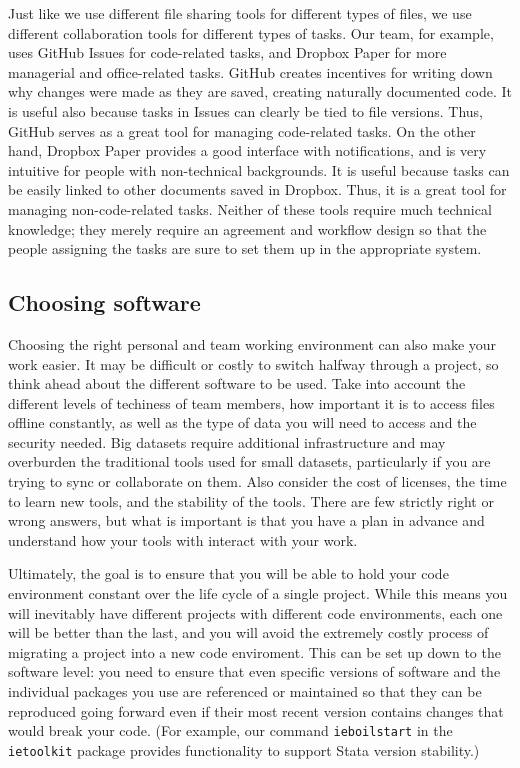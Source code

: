 Just like we use different file sharing tools for different types of files,
we use different collaboration tools for different types of tasks.
Our team, for example, uses GitHub Issues for code-related tasks,
and Dropbox Paper for more managerial and office-related tasks.
GitHub creates incentives for writing down why changes were made
as they are saved, creating naturally documented code.
It is useful also because tasks in Issues can clearly be tied to file versions.
Thus, GitHub serves as a great tool for managing code-related tasks.
On the other hand, Dropbox Paper provides a good interface with notifications,
and is very intuitive for people with non-technical backgrounds.
It is useful because tasks can be easily linked to other documents saved in Dropbox.
Thus, it is a great tool for managing non-code-related tasks.
Neither of these tools require much technical knowledge;
they merely require an agreement and workflow design
so that the people assigning the tasks are sure to set them up in the appropriate system.

\subsection{Choosing software}

Choosing the right personal and team working environment can also make your work easier.
It may be difficult or costly to switch halfway through a project, so
think ahead about the different software to be used.
Take into account the different levels of techiness of team members,
how important it is to access files offline constantly,
as well as the type of data you will need to access and the security needed.
Big datasets require additional infrastructure and may overburden
the traditional tools used for small datasets,
particularly if you are trying to sync or collaborate on them.
Also consider the cost of licenses, the time to learn new tools,
and the stability of the tools.
There are few strictly right or wrong answers,
but what is important is that you have a plan in advance
and understand how your tools with interact with your work.

Ultimately, the goal is to ensure that you will be able to hold
your code environment constant over the life cycle of a single project.
While this means you will inevitably have different projects
with different code environments, each one will be better than the last,
and you will avoid the extremely costly process of migrating a project
into a new code enviroment.
This can be set up down to the software level:
you need to ensure that even specific versions of software
and the individual packages you use
are referenced or maintained so that they can be reproduced going forward
even if their most recent version contains changes that would break your code.
(For example, our command \texttt{ieboilstart} in the \texttt{ietoolkit} package
provides functionality to support Stata version stability.)


